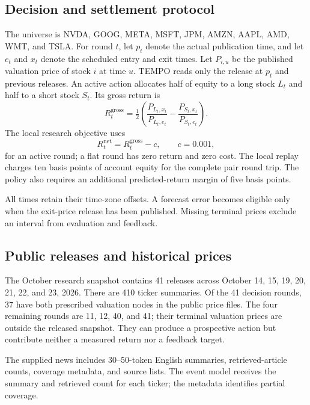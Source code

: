 \documentclass[conference]{IEEEtran}
\begin{document}
\subsection{Decision and settlement protocol}
The universe is NVDA, GOOG, META, MSFT, JPM, AMZN, AAPL, AMD, WMT, and TSLA. For round $t$, let $p_t$ denote the actual publication time, and let $e_t$ and $x_t$ denote the scheduled entry and exit times. Let $P_{i,u}$ be the published valuation price of stock $i$ at time $u$. TEMPO reads only the release at $p_t$ and previous releases. An active action allocates half of equity to a long stock $L_t$ and half to a short stock $S_t$. Its gross return is
\begin{equation}
 R_t^{\mathrm{gross}}=\tfrac12\left(
 \frac{P_{L_t,x_t}}{P_{L_t,e_t}}-
 \frac{P_{S_t,x_t}}{P_{S_t,e_t}}\right).
\end{equation}
The local research objective uses
\begin{equation}
 R_t^{\mathrm{net}}=R_t^{\mathrm{gross}}-c,
 \qquad c=0.001,
\end{equation}
for an active round; a flat round has zero return and zero cost. The local replay charges ten basis points of account equity for the complete pair round trip. The policy also requires an additional predicted-return margin of five basis points.

All times retain their time-zone offsets. A forecast error becomes eligible only when the exit-price release has been published. Missing terminal prices exclude an interval from evaluation and feedback.

\subsection{Public releases and historical prices}
The October research snapshot contains 41 releases across October 14, 15, 19, 20, 21, 22, and 23, 2026. There are 410 ticker summaries. Of the 41 decision rounds, 37 have both prescribed valuation nodes in the public price files. The four remaining rounds are 11, 12, 40, and 41; their terminal valuation prices are outside the released snapshot. They can produce a prospective action but contribute neither a measured return nor a feedback target.

The supplied news includes 30--50-token English summaries, retrieved-article counts, coverage metadata, and source lists. The event model receives the summary and retrieved count for each ticker; the metadata identifies partial coverage.
\end{document}
